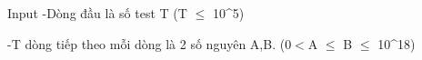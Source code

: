 Input
-Dòng đầu là số test T (T $\le$ 10^5)  

   -T dòng tiếp theo mỗi dòng là 2 số nguyên A,B. (0$<$A $\le$ B $\le$ 10^18)